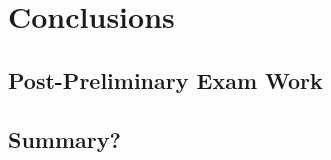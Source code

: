 \chapter{Conclusions}\label{ch:conclusions}
\section{Post-Preliminary Exam Work}
\section{Summary?}
